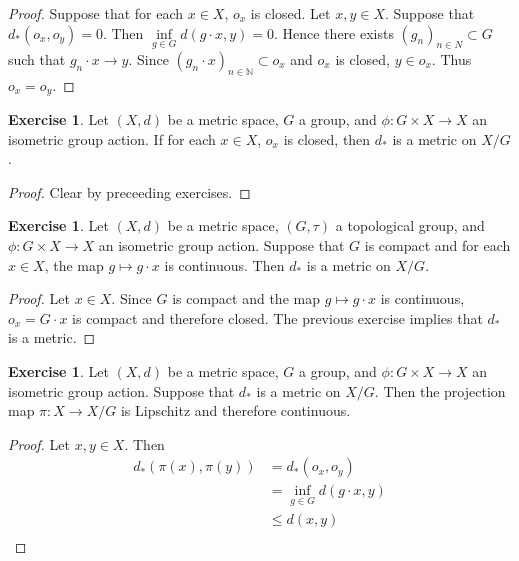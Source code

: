 \documentclass[12pt]{amsart}
\theoremstyle{definition}
\newtheorem{ex}[definition]{Exercise}
\newcommand{\N}{\mathbb{N}}
\begin{document}
	\begin{proof}
	Suppose that for each $x \in X$, $o_x$ is closed. Let $x,y \in X$. Suppose that $d_*(o_x , o_y) = 0$. Then $\inf\limits_{ g \in G} d(g \cdot x, y) = 0$. Hence there exists $(g_n)_{n \in N} \subset G$ such that $g_n \cdot x \rightarrow y$. Since $(g_n \cdot x)_{n \in \N} \subset o_x$ and $o_x$ is closed, $y \in o_x$. Thus $o_x = o_y$. 
	\end{proof}
	
	\begin{ex}
	Let $(X, d)$ be a metric space, $G$ a group, and $\phi: G \times X \rightarrow X$ an isometric group action. If for each $x \in X$, $o_x$ is closed, then $d_*$ is a metric on $X/G$.
	\end{ex}
	
	\begin{proof}
	Clear by preceeding exercises.
	\end{proof}
	
	\begin{ex}
	Let $(X, d)$ be a metric space, $(G, \tau)$ a topological group, and $\phi: G \times X \rightarrow X$ an isometric group action. Suppose that $G$ is compact and for each $x \in X$, the map $g \mapsto g \cdot x$ is continuous. Then $d_*$ is a metric on $X/G$. 
	\end{ex}
	
	\begin{proof}
	Let $x \in X$. Since $G$ is compact and the map $g \mapsto g \cdot x$ is continuous, $o_x = G \cdot x$ is compact and therefore closed. The previous exercise implies that $d_*$ is a metric.
	\end{proof}
	
	\begin{ex}
	Let $(X, d)$ be a metric space, $G$ a group, and $\phi: G \times X \rightarrow X$ an isometric group action. Suppose that $d_*$ is a metric on $X/G$. Then the projection map $\pi: X \rightarrow X/G$ is Lipschitz and therefore continuous.
	\end{ex}
	
	\begin{proof}
	Let $x,y \in X$. Then
	\begin{align*}
	d_*(\pi(x), \pi(y)) 
	&= d_*(o_x, o_y) \\
	&= \inf_{g \in G} d(g \cdot x, y)\\
	& \leq d(x,y)  \\
	\end{align*}
	\end{proof}
	
\end{document}
